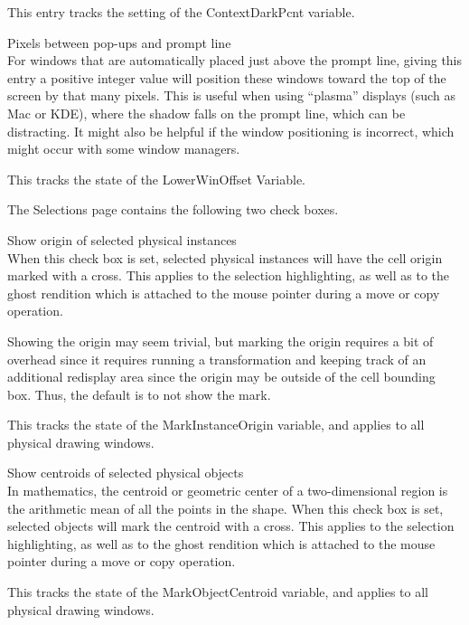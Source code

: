 \begin{description}
This entry tracks the setting of the {\et ContextDarkPcnt} variable.

\item{\cb Pixels between pop-ups and prompt line}\\
For windows that are automatically placed just above the prompt line,
giving this entry a positive integer value will position these windows
toward the top of the screen by that many pixels.  This is useful when
using ``plasma'' displays (such as Mac or KDE), where the shadow falls
on the prompt line, which can be distracting.  It might also be
helpful if the window positioning is incorrect, which might occur with
some window managers.

This tracks the state of the {\et LowerWinOffset} Variable.
\end{description}

The {\cb Selections} page contains the following two check boxes.

\begin{description}
\item{\cb Show origin of selected physical instances}\\
When this check box is set, selected physical instances will have the cell
origin marked with a cross.  This applies to the selection
highlighting, as well as to the ghost rendition which is attached to
the mouse pointer during a move or copy operation.

Showing the origin may seem trivial, but marking the origin requires a
bit of overhead since it requires running a transformation and keeping
track of an additional redisplay area since the origin may be outside
of the cell bounding box.  Thus, the default is to not show the mark.

This tracks the state of the {\et MarkInstanceOrigin} variable, and
applies to all physical drawing windows.

\item{\cb Show centroids of selected physical objects}\\
In mathematics, the centroid or geometric center of a two-dimensional
region is the arithmetic mean of all the points in the shape.  When
this check box is set, selected objects will mark the centroid with a
cross.  This applies to the selection highlighting, as well as to the
ghost rendition which is attached to the mouse pointer during a move
or copy operation.

This tracks the state of the {\et MarkObjectCentroid} variable, and
applies to all physical drawing windows.
\end{description}

